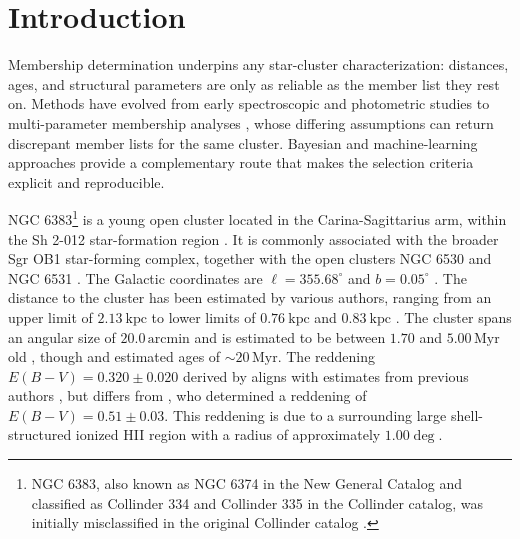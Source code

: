 \documentclass{aa}
\begin{document}


   \maketitle
\nolinenumbers

\section{Introduction}\label{S_intro}
Membership determination underpins any star-cluster characterization: distances, ages, and structural parameters are only as reliable as the member list they rest on. Methods have evolved from early spectroscopic and photometric studies \citep[e.g.,][]{1930LicOB..14..154T,1949ApJ...110..117S,1968ArA.....5....1L,1978MNRAS.182..607F} to multi-parameter membership analyses \citep{1989MNRAS.236..263P,1991MNRAS.249...76B,2005AA...438.1163K,2007AA...462..157P,2018AA...610A..30A}, whose differing assumptions can return discrepant member lists for the same cluster. Bayesian and machine-learning approaches provide a complementary route that makes the selection criteria explicit and reproducible.

NGC 6383\footnote{NGC 6383, also known as NGC 6374 in the New General Catalog \citep{2008hsf2.book..497R} and classified as Collinder 334 and Collinder 335 in the Collinder catalog, was initially misclassified in the original Collinder catalog \citep{1931AnLun...2....1C}.} is a young open cluster located in the Carina-Sagittarius arm, within the Sh 2-012 star-formation region \citep{1959ApJS....4..257S}. It is commonly associated with the broader Sgr OB1 star-forming complex, together with the open clusters NGC 6530 and NGC 6531 \citep{2008hsf2.book..497R}. The Galactic coordinates are $\ell = 355.68^{\circ}$ and $b = 0.05^{\circ}$ \citep{2017A&A...600A.106C}. The distance to the cluster has been estimated by various authors, ranging from an upper limit of $2.13~\mathrm{kpc}$ \citep{1930LicOB..14..154T} to lower limits of $0.76~\mathrm{kpc}$ \citep{1949ApJ...110..117S} and $0.83~\mathrm{kpc}$ \citep{2018AA...610A..30A}. The cluster spans an angular size of $20.0\,\mathrm{arcmin}$ \citep{2013A&A...560A..76M} and is estimated to be between $1.70$ and $5.00\,\mathrm{Myr}$ old \citep{1978MNRAS.182..607F,1989MNRAS.236..263P,2005AA...438.1163K,2007AA...462..157P}, though \citet{1968ArA.....5....1L} and \citet{1991MNRAS.249...76B} estimated ages of $\sim20\,\mathrm{Myr}$. The reddening $E(B-V) = 0.320 \pm 0.020$ derived by \citet{2008hsf2.book..497R} aligns with estimates from previous authors \citep{1971AAS....4..241B,1978MNRAS.182..607F,1978MNRAS.184..661L,1985AA...151..391T,1989MNRAS.236..263P,1994RMxAA..29..141F,2007AA...462..157P}, but differs from \citet{2018AA...610A..30A}, who determined a reddening of $E(B-V) = 0.51 \pm 0.03$. This reddening is due to a surrounding large shell-structured ionized HII region with a radius of approximately $1.00\deg$.
\end{document}
